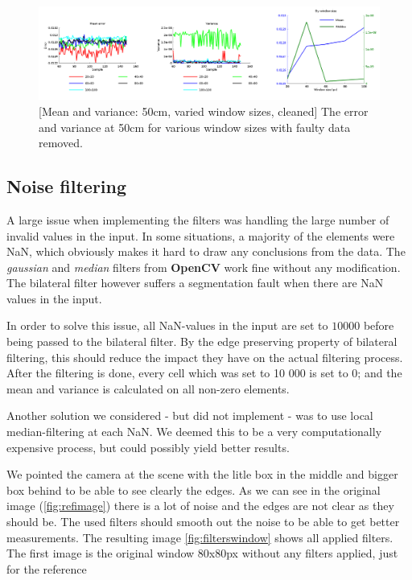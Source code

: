 \documentclass[11pt]{article}
\begin{document}
\begin{figure}[ht]
  \centering
  \includegraphics[width=1\textwidth]{figures/plot2bywindowsize.png}
  [Mean and variance: 50cm, varied window sizes, cleaned]{\label{fig:variedwindow2} The error and variance at 50cm for various window sizes with faulty data removed.}
\end{figure}

\subsection{Noise filtering}
A large issue when implementing the filters was handling the large number of invalid values in the input. In some situations, a majority of the elements were NaN, which obviously makes it hard to draw any conclusions from the data. The \emph{gaussian} and \emph{median} filters from \textbf{OpenCV} work fine  without any modification. The bilateral filter however suffers a segmentation fault when there are NaN values in the input. \par

In order to solve this issue, all NaN-values in the input are set to $10000$ before being passed to the bilateral filter. By the edge preserving property of bilateral filtering, this should reduce the impact they have on the actual filtering process. After the filtering is done, every cell which was set to 10 000 is set to 0; and the mean and variance is calculated on all non-zero elements. \par
Another solution we considered - but did not implement - was to use local median-filtering at each NaN. We deemed this to be a very computationally expensive process, but could possibly yield better results. \par
We pointed the camera at the scene with the litle box in the middle and bigger box behind to be able to see clearly the edges. As we can see in the original image (\vref{fig:refimage}) there is a lot of noise and the edges are not clear as they should be. The used filters should smooth out the noise to be able to get better measurements. The resulting image \vref{fig:filterswindow} shows all applied filters. The first image is the original window 80x80px without any filters applied, just for the reference
\end{document}
